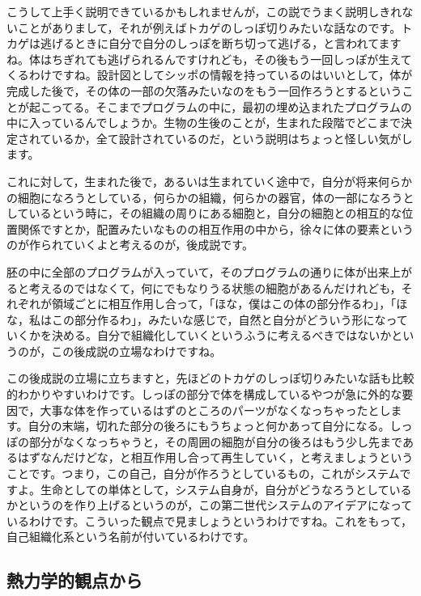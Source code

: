 \documentclass{ltjsbook}
\begin{document}
こうして上手く説明できているかもしれませんが，この説でうまく説明しきれないことがありまして，それが例えばトカゲのしっぽ切りみたいな話なのです。トカゲは逃げるときに自分で自分のしっぽを断ち切って逃げる，と言われてますね。体はちぎれても逃げられるんですけれども，その後もう一回しっぽが生えてくるわけですね。設計図としてシッポの情報を持っているのはいいとして，体が完成した後で，その体の一部の欠落みたいなのをもう一回作ろうとするということが起こってる。そこまでプログラムの中に，最初の埋め込まれたプログラムの中に入っているんでしょうか。生物の生後のことが，生まれた段階でどこまで決定されているか，全て設計されているのだ，という説明はちょっと怪しい気がします。

これに対して，生まれた後で，あるいは生まれていく途中で，自分が将来何らかの細胞になろうとしている，何らかの組織，何らかの器官，体の一部になろうとしているという時に，その組織の周りにある細胞と，自分の細胞との相互的な位置関係ですとか，配置みたいなものの相互作用の中から，徐々に体の要素というのが作られていくよと考えるのが，後成説です。

胚の中に全部のプログラムが入っていて，そのプログラムの通りに体が出来上がると考えるのではなくて，何にでもなりうる状態の細胞があるんだけれども，それぞれが領域ごとに相互作用し合って，「ほな，僕はこの体の部分作るわ」，「ほな，私はこの部分作るわ」，みたいな感じで，自然と自分がどういう形になっていくかを決める。自分で組織化していくというふうに考えるべきではないかというのが，この後成説の立場なわけですね。

この後成説の立場に立ちますと，先ほどのトカゲのしっぽ切りみたいな話も比較的わかりやすいわけです。しっぽの部分で体を構成しているやつが急に外的な要因で，大事な体を作っているはずのところのパーツがなくなっちゃったとします。自分の末端，切れた部分の後ろにもうちょっと何かあって自分になる。しっぽの部分がなくなっちゃうと，その周囲の細胞が自分の後ろはもう少し先まであるはずなんだけどな，と相互作用し合って再生していく，と考えましょうということです。つまり，この自己，自分が作ろうとしているもの，これがシステムですよ。生命としての単体として，システム自身が，自分がどうなろうとしているかというのを作り上げるというのが，この第二世代システムのアイデアになっているわけです。こういった観点で見ましょうというわけですね。これをもって，自己組織化系という名前が付いているわけです。

\subsection{熱力学的観点から}
\end{document}
